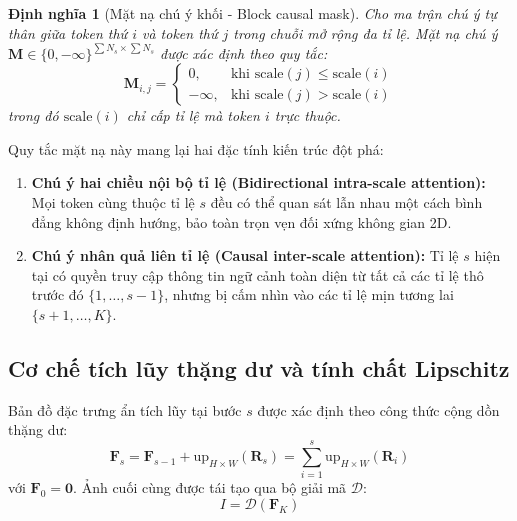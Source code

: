 \documentclass[10pt,twocolumn,letterpaper]{article}
\newtheorem{definition}{Định nghĩa}
\begin{document}
\begin{definition}[Mặt nạ chú ý khối - Block causal mask]
Cho ma trận chú ý tự thân giữa token thứ $i$ và token thứ $j$ trong chuỗi mở rộng đa tỉ lệ. Mặt nạ chú ý $\mathbf{M} \in \{0, -\infty\}^{\sum N_s \times \sum N_s}$ được xác định theo quy tắc:
\begin{equation}
\mathbf{M}_{i, j} = \begin{cases}
0, & \text{khi } \text{scale}(j) \le \text{scale}(i) \\
-\infty, & \text{khi } \text{scale}(j) > \text{scale}(i)
\end{cases}
\end{equation}
trong đó $\text{scale}(i)$ chỉ cấp tỉ lệ mà token $i$ trực thuộc.
\end{definition}

Quy tắc mặt nạ này mang lại hai đặc tính kiến trúc đột phá:
\begin{enumerate}
    \item \textbf{Chú ý hai chiều nội bộ tỉ lệ (Bidirectional intra-scale attention):} Mọi token cùng thuộc tỉ lệ $s$ đều có thể quan sát lẫn nhau một cách bình đẳng không định hướng, bảo toàn trọn vẹn đối xứng không gian 2D.
    \item \textbf{Chú ý nhân quả liên tỉ lệ (Causal inter-scale attention):} Tỉ lệ $s$ hiện tại có quyền truy cập thông tin ngữ cảnh toàn diện từ tất cả các tỉ lệ thô trước đó $\{1, \dots, s-1\}$, nhưng bị cấm nhìn vào các tỉ lệ mịn tương lai $\{s+1, \dots, K\}$.
\end{enumerate}

\subsection{Cơ chế tích lũy thặng dư và tính chất Lipschitz}
Bản đồ đặc trưng ẩn tích lũy tại bước $s$ được xác định theo công thức cộng dồn thặng dư:
\begin{equation}
\mathbf{F}_s = \mathbf{F}_{s-1} + \text{up}_{H \times W}(\mathbf{R}_s) = \sum_{i=1}^{s} \text{up}_{H \times W}(\mathbf{R}_i) \label{eq:var_accum_full}
\end{equation}
với $\mathbf{F}_0 = \mathbf{0}$. Ảnh cuối cùng được tái tạo qua bộ giải mã $\mathcal{D}$:
\begin{equation}
I = \mathcal{D}(\mathbf{F}_K)
\end{equation}
\end{document}
